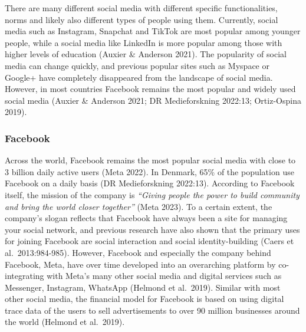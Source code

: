 \documentclass[
]{article}
\begin{document}
There are many different social media with different specific
functionalities, norms and likely also different types of people using
them. Currently, social media such as Instagram, Snapchat and TikTok are
most popular among younger people, while a social media like LinkedIn is
more popular among those with higher levels of education (Auxier \&
Anderson 2021). The popularity of social media can change quickly, and
previous popular sites such as Myspace or Google+ have completely
disappeared from the landscape of social media. However, in most
countries Facebook remains the most popular and widely used social media
(Auxier \& Anderson 2021; DR Medieforskning 2022:13; Ortiz-Ospina 2019).

\hypertarget{facebook}{%
\subsubsection{Facebook}\label{facebook}}

\noindent Across the world, Facebook remains the most popular social
media with close to 3 billion daily active users (Meta 2022). In
Denmark, 65\% of the population use Facebook on a daily basis (DR
Medieforskning 2022:13). According to Facebook itself, the mission of
the company is \emph{``Giving people the power to build community and
bring the world closer together''} (Meta 2023). To a certain extent, the
company's slogan reflects that Facebook have always been a site for
managing your social network, and previous research have also shown that
the primary uses for joining Facebook are social interaction and social
identity-building (Caers et al.~2013:984-985). However, Facebook and
especially the company behind Facebook, Meta, have over time developed
into an overarching platform by co-integrating with Meta's many other
social media and digital services such as Messenger, Instagram, WhatsApp
(Helmond et al.~2019). Similar with most other social media, the
financial model for Facebook is based on using digital trace data of the
users to sell advertisements to over 90 million businesses around the
world (Helmond et al.~2019).
\end{document}
